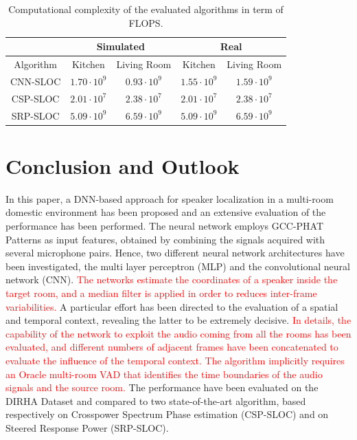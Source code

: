 \documentclass[review]{elsarticle}
\begin{document}
\begin{table}[t]
\centering
\caption{Computational complexity of the evaluated algorithms in term of FLOPS.}\label{tab:comp_cost}
\begin{tabular}{c | c | c | c | c}
\hline
 & \multicolumn{2}{c|}{Simulated} & \multicolumn{2}{c}{Real} \\
\hline
Algorithm          &  Kitchen & Living Room & Kitchen & Living Room \\
\hline
CNN-SLOC & $1.70 \cdot 10^9$  &   $0.93 \cdot 10^9$  & $1.55  \cdot 10^9$    & $1.59\cdot 10^9$     \\
CSP-SLOC  &  $2.01 \cdot 10^7$  & $2.38 \cdot 10^7$ &   $2.01 \cdot 10^7$        &  $2.38 \cdot 10^7$    \\
SRP-SLOC & $5.09 \cdot 10^9$  & $6.59 \cdot 10^9 $ &  $5.09 \cdot 10^9$ &  $6.59 \cdot 10^9 $ \\    \hline
\end{tabular}
\end{table}


\section{Conclusion and Outlook}
\label{sec:concl}

In this paper, a DNN-based approach for speaker localization in a multi-room domestic environment has been proposed and an extensive evaluation of the performance has been performed. The neural network employs GCC-PHAT Patterns as input features, obtained by combining the signals acquired with several microphone pairs. Hence, two different neural network architectures have been investigated, the multi layer perceptron (MLP) and the convolutional neural network (CNN). \textcolor{red}{The networks estimate the coordinates of a speaker inside the target room, and a median filter is applied in order to reduces inter-frame variabilities.} A particular effort has been directed to the evaluation of a spatial and temporal context, revealing the latter to be extremely decisive. \textcolor{red}{In details, the capability of the network to exploit the audio coming from all the rooms has been evaluated, and different numbers of adjacent frames have been concatenated to evaluate the influence of the temporal context.}
\textcolor{red}{The algorithm implicitly requires an Oracle multi-room VAD that identifies the time boundaries of the audio signals and the source room.} The performance have been evaluated on the DIRHA Dataset and compared to two state-of-the-art algorithm, based respectively on Crosspower Spectrum Phase estimation (CSP-SLOC) and on Steered Response Power (SRP-SLOC).
\end{document}

